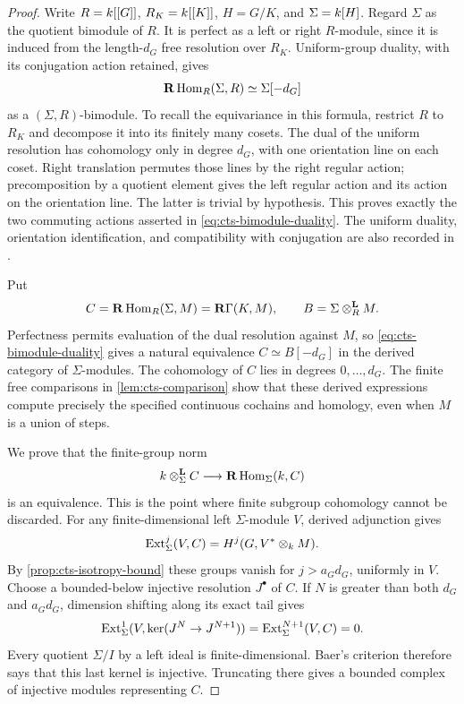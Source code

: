 \begin{proof}
Write $R=k[[G]]$, $R_K=k[[K]]$, $H=G/K$, and
$\Sigma=k[H]$.  Regard $\Sigma$ as the quotient bimodule of $R$.
It is perfect as a left or right $R$-module, since it is induced
from the length-$d_G$ free resolution over $R_K$.  Uniform-group
duality, with its conjugation action retained, gives
\begin{equation}
 \mathbf R\operatorname{Hom}_R(\Sigma,R)\simeq\Sigma[-d_G]
 \label{eq:cts-bimodule-duality}
\end{equation}
as a $(\Sigma,R)$-bimodule.  To recall the equivariance in this
formula, restrict $R$ to $R_K$ and decompose it into its finitely
many cosets.  The dual of the uniform resolution has cohomology
only in degree $d_G$, with one orientation line on each coset.
Right translation permutes those lines by the right regular action;
precomposition by a quotient element gives the left regular action
and its action on the orientation line.  The latter is trivial by
hypothesis.  This proves exactly the two commuting actions asserted
in \eqref{eq:cts-bimodule-duality}.  The uniform duality, orientation
identification, and compatibility with conjugation are also recorded in
\citet[Propositions~4.16 and~4.36, Theorem~4.19 and
Remark~4.23]{bghs}.

Put
\[
 C=\mathbf R\operatorname{Hom}_R(\Sigma,M)=\mathbf R\Gamma(K,M),\qquad
 B=\Sigma\otimes_R^{\mathbf L}M.
\]
Perfectness permits evaluation of the dual resolution against $M$,
so \eqref{eq:cts-bimodule-duality} gives a natural equivalence
$C\simeq B[-d_G]$ in the derived category of $\Sigma$-modules.
The cohomology of $C$ lies in degrees $0,\ldots,d_G$.  The finite
free comparisons in \cref{lem:cts-comparison} show that these
derived expressions compute precisely the specified continuous
cochains and homology, even when $M$ is a union of steps.

We prove that the finite-group norm
\begin{equation}
       k\otimes_\Sigma^{\mathbf L}C
           \longrightarrow\mathbf R\operatorname{Hom}_\Sigma(k,C)
       \label{eq:cts-finite-norm}
\end{equation}
is an equivalence.  This is the point where finite subgroup
cohomology cannot be discarded.  For any finite-dimensional left
$\Sigma$-module $V$, derived adjunction gives
\[
 \operatorname{Ext}^j_\Sigma(V,C)
       =H^j(G,V^*\otimes_k M).
\]
By \cref{prop:cts-isotropy-bound} these groups vanish for
$j>a_Gd_G$, uniformly in $V$.  Choose a bounded-below injective
resolution $J^\bullet$ of $C$.  If $N$ is greater than both $d_G$
and $a_Gd_G$, dimension shifting along its exact tail gives
\[
 \operatorname{Ext}^1_\Sigma(V,\ker(J^N\to J^{N+1}))
       =\operatorname{Ext}^{N+1}_\Sigma(V,C)=0.
\]
Every quotient $\Sigma/I$ by a left ideal is finite-dimensional.
Baer's criterion therefore says that this last kernel is injective.
Truncating there gives a bounded complex of injective modules
representing $C$.


\end{proof}
